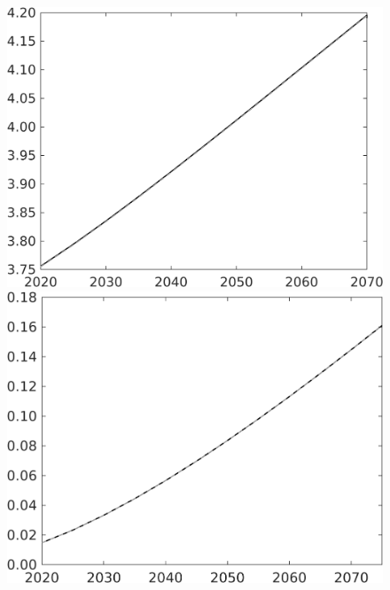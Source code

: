 \documentclass[12pt]{article}
\begin{document}
\begin{figure}[h!!]
\begin{minipage}[]{0.32\textwidth}
	\end{minipage}	
	\begin{minipage}[]{0.32\textwidth}
		\includegraphics[width=1\textwidth]{../../codding_model/own_basedOnFried/optimalPol_010922_revision/figures/all_13Sept22/CompTaul_LFBAU_Reg0_gAf_spillover0_nsk0_xgr0_knspil0_sep1_countec0_GovRev0_etaa0.79_lgd0.png}
	\end{minipage}	
	\begin{minipage}[]{0.32\textwidth}
		\includegraphics[width=1\textwidth]{../../codding_model/own_basedOnFried/optimalPol_010922_revision/figures/all_13Sept22/CompTaul_Equlab_LFBAU_Reg0_AgAf_spillover0_nsk0_xgr0_knspil0_sep1_countec0_GovRev0_etaa0.79_lgd0.png}

\end{minipage}
\end{figure}
\end{document}
